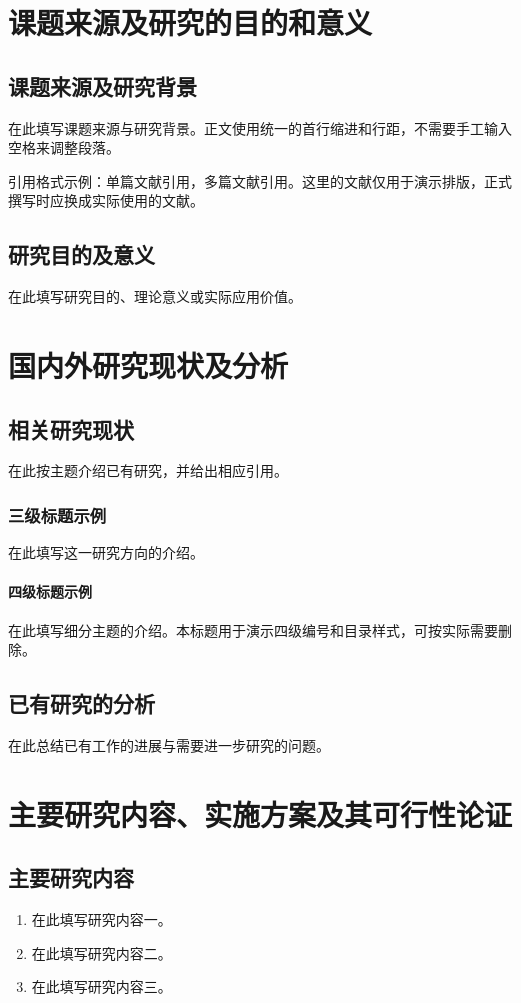 \documentclass[UTF8,fontset=none,scheme=plain,zihao=-4]{ctexart}
\begin{document}
\makeproposalcover
\proposaltableofcontents

\section{课题来源及研究的目的和意义}
\subsection{课题来源及研究背景}
在此填写课题来源与研究背景。正文使用统一的首行缩进和行距，不需要手工输入空格来调整段落。

引用格式示例：单篇文献引用\cite{latex-book}，多篇文献引用\cite{latex-book,texbook,ctex-package}。这里的文献仅用于演示排版，正式撰写时应换成实际使用的文献。

\subsection{研究目的及意义}
在此填写研究目的、理论意义或实际应用价值。

\section{国内外研究现状及分析}
\subsection{相关研究现状}
在此按主题介绍已有研究，并给出相应引用。

\subsubsection{三级标题示例}
在此填写这一研究方向的介绍。

\paragraph{四级标题示例}
在此填写细分主题的介绍。本标题用于演示四级编号和目录样式，可按实际需要删除。

\subsection{已有研究的分析}
在此总结已有工作的进展与需要进一步研究的问题。

\section{主要研究内容、实施方案及其可行性论证}
\subsection{主要研究内容}
\begin{enumerate}
  \item 在此填写研究内容一。
  \item 在此填写研究内容二。
  \item 在此填写研究内容三。
\end{enumerate}
\end{document}
